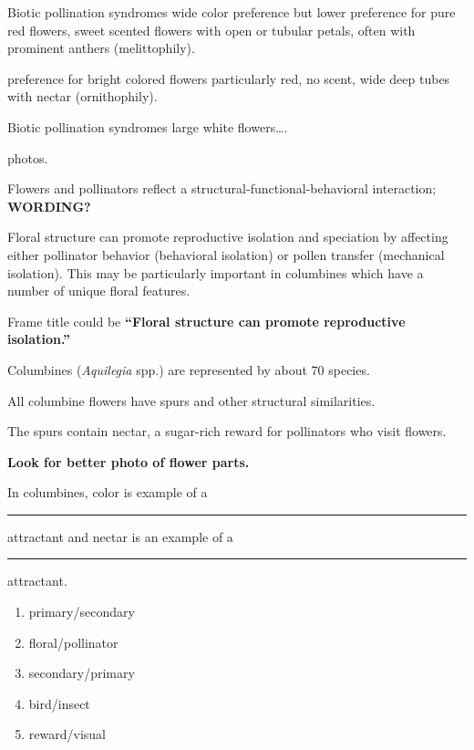 \documentclass[t]{beamer}
\newcommand{\ques}[1]{\highlight{\textsc{q#1:}}}
\begin{document}
%
\begin{frame}[t]{Biotic pollination syndromes}
	\hangpara {} wide color preference but lower preference for pure red flowers, sweet scented flowers with open or tubular petals, often with prominent anthers (melittophily).
	
	\hangpara {} preference for bright colored flowers particularly red, no scent, wide deep tubes with nectar (ornithophily).
	
\end{frame}
%
\begin{frame}[t]{Biotic pollination syndromes}
	\hangpara {} large white flowers\dots.
	
	\hangpara {} photos.
	
\end{frame}
%
\begin{frame}[t]{Flowers and pollinators reflect a structural-functional-behavioral interaction; \textbf{WORDING?}}
	
	\hangpara Floral structure can promote reproductive isolation and speciation by affecting either pollinator behavior (behavioral isolation) or pollen transfer (mechanical isolation). This may be particularly important in columbines which have a number of unique floral features.  
	
	Frame title could be \textbf{“Floral structure can promote reproductive isolation.”}

\end{frame}
%
\begin{frame}[t]{Columbines (\textit{Aquilegia} spp.) are represented by about 70 species.}
	
	\hangpara All columbine flowers have spurs and other structural similarities.
	
	\hangpara The spurs contain nectar, a sugar-rich reward for pollinators who visit flowers.  

	\hangpara \textbf{Look for better photo of flower parts.}
\end{frame}
%
\begin{frame}[t]{\ques7 In columbines, color is example of a \rule{0.5in}{0.4pt} attractant and nectar is an example of a \rule{0.5in}{0.4pt} attractant.}
	\begin{enumerate}
		\item primary/secondary
		\item floral/pollinator
		\item secondary/primary
		\item bird/insect
		\item reward/visual
	\end{enumerate}
\end{frame}
\end{document}
